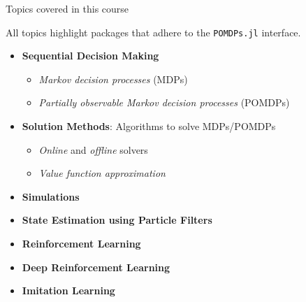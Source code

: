 \begin{frame}[fragile]{Topics covered in this course}

\begin{highlightblock}
All topics highlight packages that adhere to the \texttt{POMDPs.jl} interface.
\end{highlightblock}

\begin{itemize}
    \item \textbf{Sequential Decision Making}
    \begin{itemize}
        \item \textit{Markov decision processes} (MDPs)
        \item \textit{Partially observable Markov decision processes} (POMDPs)
    \end{itemize}
    \item \textbf{Solution Methods}: Algorithms to solve MDPs/POMDPs
    \begin{itemize}
        \item \textit{Online} and \textit{offline} solvers
        \item \textit{Value function approximation}
    \end{itemize}
    \item \textbf{Simulations}
    \item \textbf{State Estimation using Particle Filters}
    \item \textbf{Reinforcement Learning}
    \item \textbf{Deep Reinforcement Learning}
    \item \textbf{Imitation Learning}
\end{itemize}


\end{frame}


